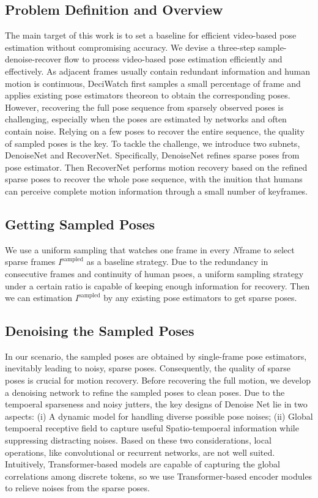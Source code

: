 \documentclass[a4paper]{report}
\begin{document}
\subsection*{Problem Definition and Overview}
The main target of this work is to set a baseline for efficient video-based pose estimation without compromising accuracy. We devise a three-step sample-denoise-recover flow to process video-based pose estimation efficiently and effectively. As adjacent frames usually contain redundant information and human motion is continuous, DeciWatch first samples a small percentage of frame and applies existing pose estimators theoreon to obtain the corresponding poses. However, recovering the full pose sequence from sparsely observed poses is challenging, especially when the poses are estimated by networks and often contain noise. Relying on a few poses to recover the entire sequence, the quality of sampled poses is the key. To tackle the challenge, we introduce two subnets, DenoiseNet and RecoverNet. Specifically, DenoiseNet refines sparse poses from pose estimator. Then RecoverNet performs motion recovery based on the refined sparse poses to recover the whole pose sequence, with the inuition that humans can perceive complete motion information through a small number of keyframes.

\subsection*{Getting Sampled Poses}
We use a uniform sampling that watches one frame in every $N$frame to select sparse frames $I^\text{sampled}$ as a baseline strategy. Due to the redundancy in consecutive frames and continuity of human psoes, a uniform sampling strategy under a certain ratio is capable of keeping enough information for recovery. Then we can estimation $I^\text{sampled}$ by any existing pose estimators to get sparse poses.

\subsection*{Denoising the Sampled Poses}
In our scenario, the sampled poses are obtained by single-frame pose estimators, inevitably leading to noisy, sparse poses. Consequently, the quality of sparse poses is crucial for motion recovery. Before recovering the full motion, we develop a denoising network to refine the sampled poses to clean poses. Due to the tempoeral sparseness and noisy jutters, the key designs of Denoise Net lie in two aspects: (i) A dynamic model for handling diverse possible pose noises; (ii) Global tempoeral receptive field to capture useful Spatio-tempoeral information while suppressing distracting noises. Based on these two considerations, local operations, like convolutional or recurrent networks, are not well suited. Intuitively, Transformer-based models are capable of capturing the global correlations among discrete tokens, so we use Transformer-based encoder modules to relieve noises from the sparse poses.
\end{document}

